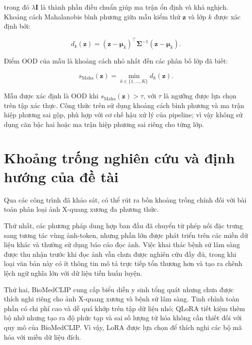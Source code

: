 trong đó $\lambda\boldsymbol{I}$ là thành phần điều chuẩn giúp ma trận ổn định và khả nghịch. Khoảng cách Mahalanobis bình phương giữa mẫu kiểm thử $\boldsymbol{z}$ và lớp $k$ được xác định bởi:

\begin{equation}
d_k(\boldsymbol{z})
= (\boldsymbol{z}-\boldsymbol{\mu}_k)^{\top}
\boldsymbol{\Sigma}^{-1}
(\boldsymbol{z}-\boldsymbol{\mu}_k).
\label{eq:maha_class_distance}
\end{equation}

Điểm OOD của mẫu là khoảng cách nhỏ nhất đến các phân bố lớp đã biết:

\begin{equation}
s_{\mathrm{Maha}}(\boldsymbol{z})
= \min_{k\in\{1,\ldots,K\}} d_k(\boldsymbol{z}).
\label{eq:maha_score}
\end{equation}

Mẫu được xác định là OOD khi
$s_{\mathrm{Maha}}(\boldsymbol{z})>\tau$, với $\tau$ là ngưỡng được lựa chọn trên tập xác thực. Công thức trên sử dụng khoảng cách bình phương và ma trận hiệp phương sai gộp, phù hợp với cơ chế hậu xử lý của pipeline; vì vậy không sử dụng căn bậc hai hoặc ma trận hiệp phương sai riêng cho từng lớp.

\section{Khoảng trống nghiên cứu và định hướng của đề tài}
\label{sec:chapter2_gap}

Qua các công trình đã khảo sát, có thể rút ra bốn khoảng trống chính đối với bài toán phân loại ảnh X-quang xương đa phương thức.

Thứ nhất, các phương pháp dung hợp ban đầu đã chuyển từ phép nối đặc trưng sang tương tác vùng ảnh-token, nhưng phần lớn được phát triển trên các miền dữ liệu khác và thường sử dụng báo cáo đọc ảnh. Việc khai thác bệnh sử lâm sàng được thu nhận trước khi đọc ảnh vẫn chưa được nghiên cứu đầy đủ, trong khi loại văn bản này có ít thông tin mô tả trực tiếp tổn thương hơn và tạo ra chênh lệch ngữ nghĩa lớn với dữ liệu tiền huấn luyện.

Thứ hai, BioMedCLIP cung cấp biểu diễn y sinh tổng quát nhưng chưa được thích nghi riêng cho ảnh X-quang xương và bệnh sử lâm sàng. Tinh chỉnh toàn phần có chi phí cao và dễ quá khớp trên tập dữ liệu nhỏ; QLoRA tiết kiệm thêm bộ nhớ nhưng tạo ra độ phức tạp và sai số lượng tử hóa không cần thiết đối với quy mô của BioMedCLIP. Vì vậy, LoRA được lựa chọn để thích nghi các bộ mã hóa với miền dữ liệu đích.

